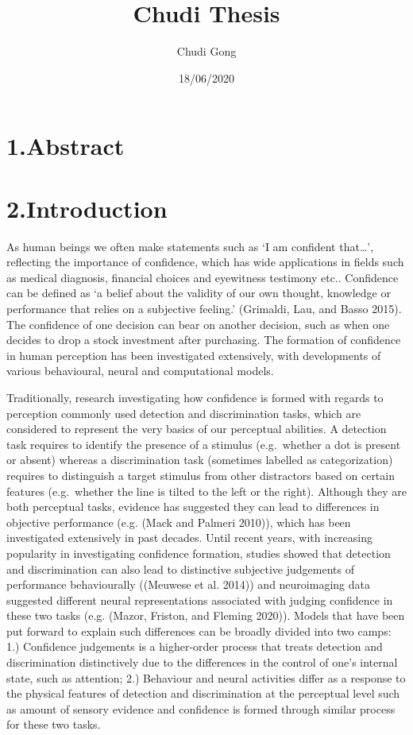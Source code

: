 \documentclass[]{article}
\title{Chudi Thesis}
\author{Chudi Gong}
\date{18/06/2020}
\begin{document}
\maketitle

\hypertarget{abstract}{%
\section{1.Abstract}\label{abstract}}

\hypertarget{introduction}{%
\section{2.Introduction}\label{introduction}}

As human beings we often make statements such as `I am confident
that\ldots{}', reflecting the importance of confidence, which has wide
applications in fields such as medical diagnosis, financial choices and
eyewitness testimony etc.. Confidence can be defined as `a belief about
the validity of our own thought, knowledge or performance that relies on
a subjective feeling.' (Grimaldi, Lau, and Basso 2015). The confidence
of one decision can bear on another decision, such as when one decides
to drop a stock investment after purchasing. The formation of confidence
in human perception has been investigated extensively, with developments
of various behavioural, neural and computational models.

Traditionally, research investigating how confidence is formed with
regards to perception commonly used detection and discrimination tasks,
which are considered to represent the very basics of our perceptual
abilities. A detection task requires to identify the presence of a
stimulus (e.g.~whether a dot is present or absent) whereas a
discrimination task (sometimes labelled as categorization) requires to
distinguish a target stimulus from other distractors based on certain
features (e.g.~whether the line is tilted to the left or the right).
Although they are both perceptual tasks, evidence has suggested they can
lead to differences in objective performance (e.g. (Mack and Palmeri
2010)), which has been investigated extensively in past decades. Until
recent years, with increasing popularity in investigating confidence
formation, studies showed that detection and discrimination can also
lead to distinctive subjective judgements of performance behaviourally
((Meuwese et al. 2014)) and neuroimaging data suggested different neural
representations associated with judging confidence in these two tasks
(e.g. (Mazor, Friston, and Fleming 2020)). Models that have been put
forward to explain such differences can be broadly divided into two
camps: 1.) Confidence judgements is a higher-order process that treats
detection and discrimination distinctively due to the differences in the
control of one's internal state, such as attention; 2.) Behaviour and
neural activities differ as a response to the physical features of
detection and discrimination at the perceptual level such as amount of
sensory evidence and confidence is formed through similar process for
these two tasks.
\end{document}
